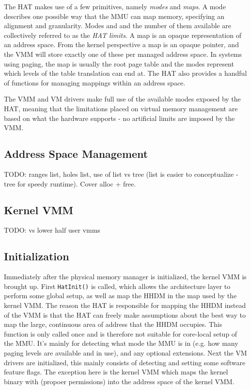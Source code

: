 The HAT makes use of a few primitives, namely \textit{modes} and \textit{maps}. A mode describes one possible way that the MMU can map memory, specifying an alignment and granularity. Modes and and the number of them available are collectively referred to as the \textit{HAT limits}. A map is an opaque representation of an address space. From the kernel perspective a map is an opaque pointer, and the VMM will store exactly one of these per managed address space. In systems using paging, the map is usually the root page table and the modes represent which levels of the table translation can end at. The HAT also provides a handful of functions for managing mappings within an address space.

The VMM and VM drivers make full use of the available modes exposed by the HAT, meaning that the limitations placed on virtual memory management are based on what the hardware supports - no artificial limits are imposed by the VMM.

\subsection{Address Space Management}
TODO: ranges list, holes list, use of list vs tree (list is easier to conceptualize - tree for speedy runtime).
Cover alloc + free.

\subsection{Kernel VMM}
TODO: vs lower half user vmms

\subsection{Initialization}
Immediately after the physical memory manager is initialized, the kernel VMM is brought up. First \verb|HatInit()| is called, which allows the architecture layer to perform some global setup, as well as map the HHDM in the map used by the kernel VMM. The reason the HAT is responsible for mapping the HHDM instead of the VMM is that the HAT can freely make assumptions about the best way to map the large, continuous area of address that the HHDM occupies. This function is only called once and is therefore not suitable for core-local setup of the MMU. It's mainly for detecting what mode the MMU is in (e.g. how many paging levels are available and in use), and any optional extensions. Next the VM drivers are initialized, this mainly consists of detecting and setting some software feature flags. The exception here is the kernel VMM which maps the kernel binary with (propoer permissions) into the address space of the kernel VMM.

